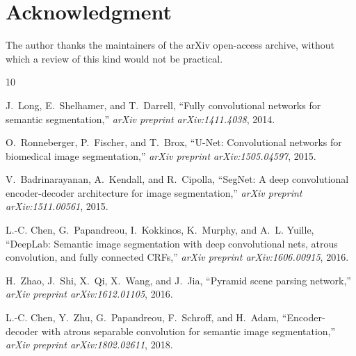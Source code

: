 \documentclass[journal]{IEEEtran}
\begin{document}
\section*{Acknowledgment}


The author thanks the maintainers of the arXiv open-access archive, without which
a review of this kind would not be practical.


\ifCLASSOPTIONcaptionsoff
  \newpage
\fi





%
%
%
\begin{thebibliography}{10}

J.~Long, E.~Shelhamer, and T.~Darrell, ``Fully convolutional networks for
  semantic segmentation,'' \emph{arXiv preprint arXiv:1411.4038}, 2014.

O.~Ronneberger, P.~Fischer, and T.~Brox, ``U-Net: Convolutional networks for
  biomedical image segmentation,'' \emph{arXiv preprint arXiv:1505.04597},
  2015.

V.~Badrinarayanan, A.~Kendall, and R.~Cipolla, ``SegNet: A deep convolutional
  encoder-decoder architecture for image segmentation,'' \emph{arXiv preprint
  arXiv:1511.00561}, 2015.

L.-C. Chen, G.~Papandreou, I.~Kokkinos, K.~Murphy, and A.~L. Yuille,
  ``DeepLab: Semantic image segmentation with deep convolutional nets, atrous
  convolution, and fully connected CRFs,'' \emph{arXiv preprint
  arXiv:1606.00915}, 2016.

H.~Zhao, J.~Shi, X.~Qi, X.~Wang, and J.~Jia, ``Pyramid scene parsing
  network,'' \emph{arXiv preprint arXiv:1612.01105}, 2016.

L.-C. Chen, Y.~Zhu, G.~Papandreou, F.~Schroff, and H.~Adam,
  ``Encoder-decoder with atrous separable convolution for semantic image
  segmentation,'' \emph{arXiv preprint arXiv:1802.02611}, 2018.

\end{thebibliography}
\end{document}
